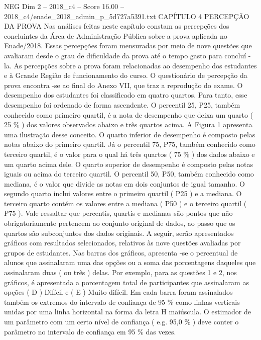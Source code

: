 \begin{textsample}{NEG Dim 2 – 2018\_c4 – Score 16.00 – 2018\_c4/enade\_2018\_admin\_p\_5d727a5391.txt}  \label{ex:f2_neg_381}
CAPÍTULO 4 PERCEPÇÃO DA PROVA Nas análises feitas neste capítulo constam as percepções dos concluintes da Área de Administração Pública sobre a prova aplicada no Enade/2018.
Essas percepções foram mensuradas por meio de nove questões que avaliaram desde o grau de dificuldade da prova até o tempo gasto para concluí -la.
As percepções sobre a prova foram relacionadas ao desempenho dos estudantes e à Grande Região de funcionamento do curso.
O questionário de percepção da prova encontra -se ao final do Anexo VII, que traz a reprodução do exame.
O desempenho dos estudantes foi classificado em quatro quartos.
Para tanto, esse desempenho foi ordenado de forma ascendente.
O percentil 25, P25, também conhecido como primeiro quartil, é a nota de desempenho que deixa um quarto ( 25 \% ) dos valores observados abaixo e três quartos acima.
A Figura 1 apresenta uma ilustração desse conceito.
O quarto inferior de desempenho é composto pelas notas abaixo do primeiro quartil.
Já o percentil 75, P75, também conhecido como terceiro quartil, é o valor para o qual há três quartos ( 75 \% ) dos dados abaixo e um quarto acima dele.
O quarto superior de desempenho é composto pelas notas iguais ou acima do terceiro quartil.
O percentil 50, P50, também conhecido como mediana, é o valor que divide as notas em dois conjuntos de igual tamanho.
O segundo quarto inclui valores entre o primeiro quartil ( P25 ) e a mediana.
O terceiro quarto contém os valores entre a mediana ( P50 ) e o terceiro quartil ( P75 ).
Vale ressaltar que percentis, quartis e medianas são pontos que não obrigatoriamente pertencem ao conjunto original de dados, ao passo que os quartos são subconjuntos dos dados originais.
A seguir, serão apresentados gráficos com resultados selecionados, relativos às nove questões avaliadas por grupos de estudantes.
Nas barras dos gráficos, apresenta -se o percentual de alunos que assinalaram uma das opções ou a soma das porcentagens daqueles que assinalaram duas ( ou três ) delas.
Por exemplo, para as questões 1 e 2, nos gráficos, é apresentada a porcentagem total de participantes que assinalaram as opções ( D ) Difícil e ( E ) Muito difícil.
Em cada barra foram assinalados também os extremos do intervalo de confiança de 95 \% como linhas verticais unidas por uma linha horizontal na forma da letra H maiúscula.
O estimador de um parâmetro com um certo nível de confiança ( e.g. 95,0 \% ) deve conter o parâmetro no intervalo de confiança em 95 \% das vezes.

\end{textsample}
